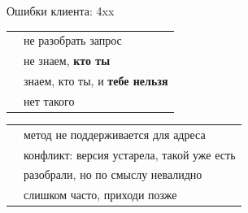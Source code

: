 \documentclass[aspectratio=169,10pt,t]{beamer}
\begin{document}
\begin{frame}{Ошибки клиента: 4xx}
  \slidetop
  \begin{minipage}[t]{0.47\textwidth}
    {\renewcommand{\arraystretch}{1.6}\small
    \begin{tabular}[t]{@{}L{1.0cm}L{4.9cm}@{}}
       & не разобрать запрос \\
       & не знаем, \textbf{кто ты} \\
       & знаем, кто ты, и \textbf{тебе нельзя} \\
       & нет такого \\
    \end{tabular}}
  \end{minipage}\hfill
  \begin{minipage}[t]{0.49\textwidth}
    {\renewcommand{\arraystretch}{1.6}\small
    \begin{tabular}[t]{@{}L{1.0cm}L{5.2cm}@{}}
       & метод не поддерживается для адреса \\
       & конфликт: версия устарела, такой уже есть \\
       & разобрали, но по смыслу невалидно \\
       & слишком часто, приходи позже \\
    \end{tabular}}
  \end{minipage}

  \slidegap
\end{frame}

\begin{frame}[plain]
\end{frame}
\end{document}
